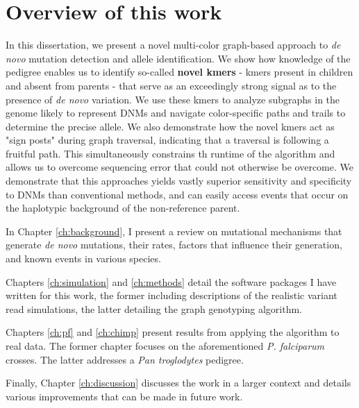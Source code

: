 \section{Overview of this work}

In this dissertation, we present a novel multi-color graph-based approach to \textit{de novo} mutation detection and allele identification.  We show how knowledge of the pedigree enables us to identify so-called \textbf{novel kmers} - kmers present in children and absent from parents - that serve as an exceedingly strong signal as to the presence of \textit{de novo} variation.  We use these kmers to analyze subgraphs in the genome likely to represent DNMs and navigate color-specific paths and trails to determine the precise allele.  We also demonstrate how the novel kmers act as "sign posts" during graph traversal, indicating that a traversal is following a fruitful path.  This simultaneously constrains th runtime of the algorithm and allows us to overcome sequencing error that could not otherwise be overcome.  We demonstrate that this approaches yields vastly superior sensitivity and specificity to DNMs than conventional methods, and can easily access events that occur on the haplotypic background of the non-reference parent.  


In Chapter \ref{ch:background}, I present a review on mutational mechanisms that generate \textit{de novo} mutations, their rates, factors that influence their generation, and known events in various species.

Chapters \ref{ch:simulation} and \ref{ch:methods} detail the software packages I have written for this work, the former including descriptions of the realistic variant read simulations, the latter detailing the graph genotyping algorithm.

Chapters \ref{ch:pf} and \ref{ch:chimp} present results from applying the algorithm to real data.  The former chapter focuses on the aforementioned \textit{P. falciparum} crosses.  The latter addresses a \textit{Pan troglodytes} pedigree.

Finally, Chapter \ref{ch:discussion} discusses the work in a larger context and details various improvements that can be made in future work.
